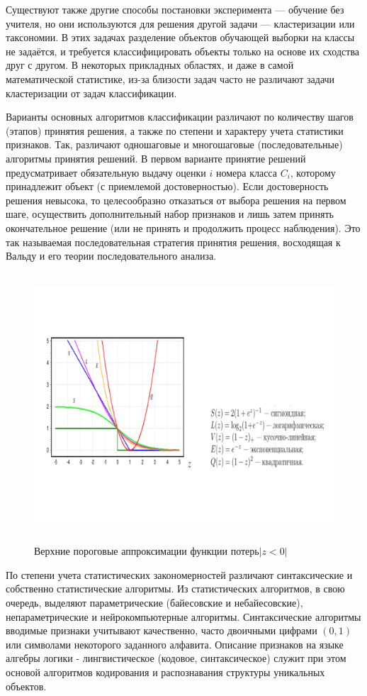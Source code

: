 Существуют также другие способы постановки эксперимента — обучение без учителя, но они используются для решения другой задачи — кластеризации или таксономии. В этих задачах разделение объектов обучающей выборки на классы не задаётся, и требуется классифицировать объекты только на основе их сходства друг с другом. В некоторых прикладных областях, и даже в самой математической статистике, из-за близости задач часто не различают задачи кластеризации от задач классификации.

Варианты основных алгоритмов классификации различают по количеству шагов (этапов) принятия решения, а также по степени и характеру учета статистики признаков. Так, различают одношаговые и многошаговые (последовательные) алгоритмы принятия решений. В первом варианте принятие решений предусматривает обязательную выдачу оценки $i$ номера класса $C_i$, которому принадлежит объект (с приемлемой достоверностью). Если достоверность решения невысока, то целесообразно отказаться от выбора решения на первом шаге, осуществить дополнительный набор признаков и лишь затем принять окончательное решение (или не принять и продолжить процесс наблюдения). Это так называемая последовательная стратегия принятия решения, восходящая к Вальду и его теории последовательного анализа. 

\begin{figure}
  \includegraphics[height=100mm,width=\textwidth]{images/upper_approximations.png}
  \caption{Верхние пороговые аппроксимации функции потерь$|z<0|$\label{upper-approximations}}
\end{figure}

По степени учета статистических закономерностей различают синтаксические и собственно статистические алгоритмы. Из статистических алгоритмов, в свою очередь, выделяют параметрические (байесовские и небайесовские), непараметрические и нейрокомпьютерные алгоритмы. Синтаксические алгоритмы вводимые признаки учитывают качественно, часто двоичными цифрами $(0,1)$  или символами некоторого заданного алфавита. Описание признаков на языке алгебры логики - лингвистическое (кодовое, синтаксическое) служит при этом основой алгоритмов кодирования и распознавания структуры уникальных объектов. 

